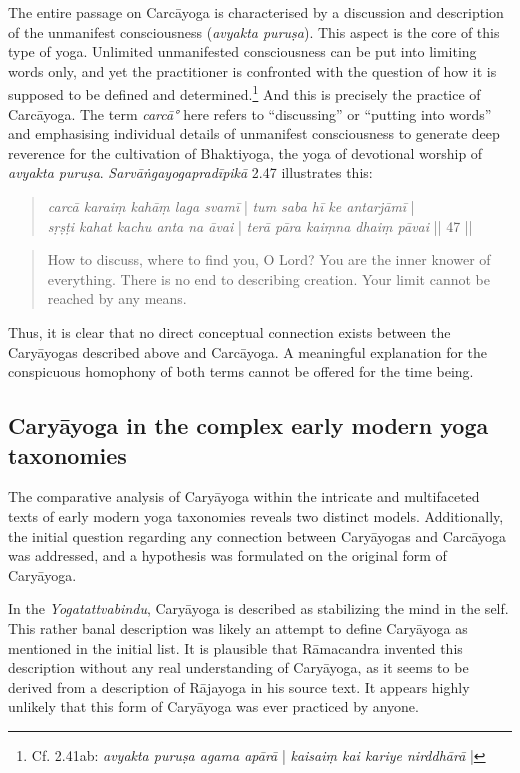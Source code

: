 The entire passage on Carcāyoga is characterised by a discussion and description of the unmanifest consciousness (\textit{avyakta puruṣa}). This aspect is the core of this type of yoga. Unlimited unmanifested consciousness can be put into limiting words only, and yet the practitioner is confronted with the question of how it is supposed to be defined and determined.\footnote{Cf.  2.41ab: \textit{avyakta puruṣa agama apārā} | \textit{kaisaiṃ kai kariye nirddhārā} |} And this is precisely the practice of Carcāyoga. The term \textit{carcā°} here refers to ``discussing'' or ``putting into words'' and emphasising individual details of unmanifest consciousness to generate deep reverence for the cultivation of Bhaktiyoga, the yoga of devotional worship of \textit{avyakta puruṣa}. \textit{Sarvāṅgayogapradīpikā} 2.47 illustrates this:
\begin{quote}
  \textit{carcā karaiṃ kahāṃ laga svamī} | \textit{tum saba hī ke antarjāmī} | \\
  \textit{sṛṣṭi kahat kachu anta na āvai} | \textit{terā pāra kaiṃna dhaiṃ pāvai} || 47 ||
  \end{quote}
\begin{quote}
How to discuss, where to find you, O Lord? You are the inner knower of everything. There is no end to describing creation. Your limit cannot be reached by any means.
\end{quote}

Thus, it is clear that no direct conceptual connection exists between the Caryāyogas described above and Carcāyoga. A meaningful explanation for the conspicuous homophony of both terms cannot be offered for the time being.  

\subsection{Caryāyoga in the complex early modern yoga taxonomies}

The comparative analysis of Caryāyoga within the intricate and multifaceted texts of early modern yoga taxonomies reveals two distinct models. Additionally, the initial question regarding any connection between Caryāyogas and Carcāyoga was addressed, and a hypothesis was formulated on the original form of Caryāyoga.

In the \textit{Yogatattvabindu}, Caryāyoga is described as stabilizing the mind in the self. This rather banal description was likely an attempt to define Caryāyoga as mentioned in the initial list. It is plausible that Rāmacandra invented this description without any real understanding of Caryāyoga, as it seems to be derived from a description of Rājayoga in his source text. It appears highly unlikely that this form of Caryāyoga was ever practiced by anyone.

